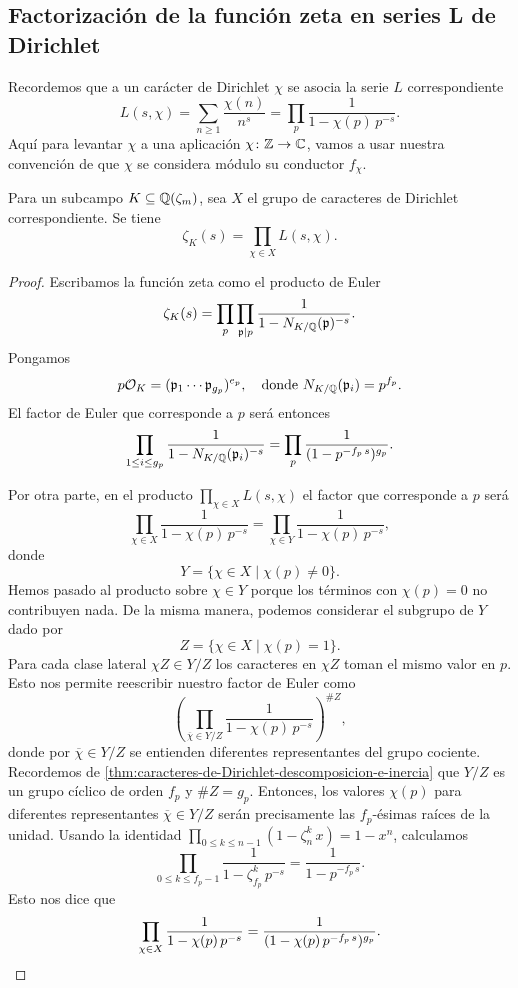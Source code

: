 \subsection{Factorización de la función zeta en series L de Dirichlet}

Recordemos que a un carácter de Dirichlet $\chi$ se asocia la serie $L$
correspondiente
\[ L (s,\chi) = \sum_{n\ge 1} \frac{\chi(n)}{n^s} =
   \prod_p \frac{1}{1 - \chi(p)\,p^{-s}}. \]
Aquí para levantar $\chi$ a una aplicación $\chi\colon \mathbb{Z}\to \mathbb{C}$, vamos a
usar nuestra convención de que $\chi$ se considera módulo su conductor $f_\chi$.

\begin{teorema}
  Para un subcampo $K \subseteq \mathbb{Q} (\zeta_m)$, sea $X$ el grupo de caracteres
  de Dirichlet correspondiente. Se tiene
  $$\zeta_K (s) = \prod_{\chi\in X} L (s,\chi).$$

  \begin{proof}
    Escribamos la función zeta como el producto de Euler
    $$\zeta_K (s) = \prod_p \prod_{\mathfrak{p}\mid p} \frac{1}{1 - N_{K/\mathbb{Q}} (\mathfrak{p})^{-s}}.$$
    Pongamos
    \[ p\mathcal{O}_K = (\mathfrak{p}_1\cdots\mathfrak{p}_{g_p})^{e_p},
       \quad \text{donde }
       N_{K/\mathbb{Q}} (\mathfrak{p}_i) = p^{f_p}. \]
    El factor de Euler que corresponde a $p$ será entonces
    \[ \prod_{1 \le i \le g_p} \frac{1}{1 - N_{K/\mathbb{Q}} (\mathfrak{p}_i)^{-s}} =
       \prod_p \frac{1}{(1 - p^{-f_p \,s})^{g_p}}. \]

    Por otra parte, en el producto $\prod_{\chi\in X} L (s,\chi)$ el factor que
    corresponde a $p$ será
    \[ \prod_{\chi\in X} \frac{1}{1 - \chi (p)\,p^{-s}} =
       \prod_{\chi\in Y} \frac{1}{1 - \chi (p)\,p^{-s}}, \]
    donde
    $$Y = \{ \chi \in X \mid \chi (p) \ne 0 \}.$$
    Hemos pasado al producto sobre $\chi \in Y$ porque los términos con
    $\chi (p) = 0$ no contribuyen nada. De la misma manera, podemos considerar
    el subgrupo de $Y$ dado por
    $$Z = \{ \chi \in X \mid \chi (p) = 1 \}.$$
    Para cada clase lateral $\chi Z \in Y/Z$ los caracteres en $\chi Z$
    toman el mismo valor en $p$. Esto nos permite reescribir nuestro
    factor de Euler como
    $$\left(\prod_{\overline{\chi}\in Y/Z} \frac{1}{1 - \chi (p)\,p^{-s}}\right)^{\# Z},$$
    donde por $\overline{\chi}\in Y/Z$ se entienden diferentes representantes
    del grupo cociente. Recordemos de
    \ref{thm:caracteres-de-Dirichlet-descomposicion-e-inercia} que $Y/Z$ es un
    grupo cíclico de orden $f_p$ y $\# Z = g_p$. Entonces, los valores
    $\chi (p)$ para diferentes representantes $\overline{\chi} \in Y/Z$ serán
    precisamente las $f_p$-ésimas raíces de la unidad. Usando la identidad
    $\prod_{0 \le k \le n-1} (1 - \zeta_n^k\,x) = 1 - x^n$, calculamos
    $$\prod_{0 \le k \le f_p-1} \frac{1}{1 - \zeta_{f_p}^k\,p^{-s}} = \frac{1}{1 - p^{-f_p\,s}}.$$
    Esto nos dice que
    \[ \prod_{\chi\in X} \frac{1}{1 - \chi (p)\,p^{-s}} =
       \frac{1}{(1 - \chi (p)\,p^{-f_p\,s})^{g_p}}. \qedhere \]
  \end{proof}
\end{teorema}

